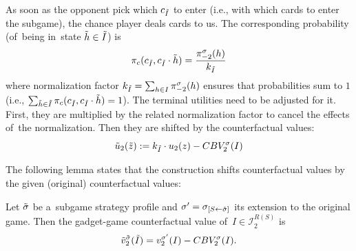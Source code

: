 As soon as the opponent pick which $c_{\tilde{I}}$ to enter (i.e., with which cards to enter the subgame), the chance player deals cards to us.
The corresponding probability (of~being in~state $\tilde{h}\in \tilde{I}$) is
\[
  \pi_c (c_{\tilde{I}}, c_{\tilde{I}} \cdot \tilde{h}) = \frac {\pi_{-2} ^{\sigma}(h)} {k_{\tilde{I}}}
\]
where normalization factor $k_{\tilde{I}} = \sum_{ h \in I} \pi_{-2}^\sigma(h)$ ensures that probabilities sum to $1$ (i.e., $\sum_{\tilde{h} \in \tilde{I}} \pi_c (c_{\tilde{I}}, c_{\tilde{I}} \cdot \tilde{h}) = 1$).
The terminal utilities need to be adjusted for it.
First, they are multiplied by the related normalization factor to cancel the effects of~the normalization.
Then they are shifted by the counterfactual values:
\begin{equation}
  \label{eq:max-margin-utilities}
  \tilde{u}_2(\tilde{z}) := k_{\tilde{I}} \cdot u_2(z) - CBV_2^\sigma(I)
\end{equation}

The following lemma states that the construction shifts counterfactual values by the given (original) counterfactual values:
\begin{lem}
  \label{lem:cfv-shift}
  Let ${\tilde{\sigma}}$ be a~subgame strategy profile and $\sigma' = \sigma_{[S \leftarrow {\tilde{\sigma}}]}$ its extension to the original game.
  Then the gadget-game counterfactual value of~$I\in\mathcal{I}_2^{R(S)}$ is
  \[
    \tilde{v}_2 ^{\tilde{\sigma}}(\tilde{I}) = v_2 ^{\sigma'}(I) - CBV_2^\sigma(I).
  \]
\end{lem}

